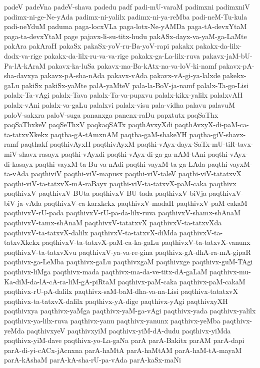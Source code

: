 {padeV
padeVna
padeV-shava
padedu
padf
padi-mU-varaM
padimxni
padimxniV
padimx-ni-ge-Ne-yAda
padimx-ni-yalilx
padimx-ni-ya-reMba
padi-neM-Tu-kula
padi-neYduM
paduma
paga-locxVLa
paga-lotx-Ne-yAMDa
paga-tA-devxYtaM
paga-ta-devxYtaM
page
pajavx-li-su-titx-hudu
pakASx-dayx-va-yaM-ga-LaMte
pakAra
pakAraH
pakaSx
pakaSx-yoV-ru-Ba-yoV-rapi
pakakx
pakakx-da-lilx-dadx-va-rige
pakakx-da-lilx-ru-va-va-rige
pakakx-ga-La-lilx-ruva
pakavx-jaM-bU-Pa-lA-kAraM
pakavx-ka-luSa
pakavx-ma-Ba-kAtx-na-va-loV-ki-namf
pakavx-pA-sha-davxya
pakavx-pA-sha-nAda
pakavx-vAda
pakavx-vA-gi-ya-lalxde
pakekx-gaLu
pakiSx
pakiSx-yaMte
palA-yaMteV
pala-la-BoV-ja-namf
palalx-Ta-go-Lisi
palalx-Ta-vAgi
palalx-Tava
palalx-Ta-va-pupxvu
palalx-kikx-yalilx
palalxvAH
palalx-vAni
palalx-va-gaLu
palalxvi
palalx-visu
pala-vidha
palavu
palavuM
paloV-sakxra
paloV-suga
pananxga
panenx-raDu
papxtutx
paqSaThx
paqSaThxkeV
paqSeThxV
paqkaqSATx
paqthAvxyXdi
paqthAvxyX-di-paM-ca-ta-tatxvXkekx
paqtha-gA-tAmxnAM
paqtha-gaM-shakeYH
paqtha-giV-shavx-ramf
paqthakf
paqthivAyxH
paqthivAyxM
paqthi-vAyx-dayx-SaTx-mU-tiR-tavx-miV-shavx-rasayx
paqthi-vAyxdi
paqthi-vAyx-di-ga-ga-nAM-tAni
paqthi-vAyx-di-kasayx
paqthi-vayxM-ta-Bu-va-nAdi
paqthi-vayxM-ta-ga-LAda
paqthi-vayxM-ta-vAda
paqthiviV
paqthi-viV-mapusx
paqthi-viV-taleV
paqthi-viV-tatatxvX
paqthi-viV-ta-tatxvX-mA-raBayx
paqthi-viV-ta-tatxvX-paM-caka
paqthivx
paqthivxV
paqthivxV-BUta
paqthivxV-BU-tada
paqthivxV-biVja
paqthivxV-biV-ja-vAda
paqthivxV-ca-karxkekx
paqthivxV-madaH
paqthivxV-paM-cakaM
paqthivxV-rU-pada
paqthivxV-rU-pa-da-lilx-ruva
paqthivxV-shamx-shAnaM
paqthivxV-tamx-shAnaM
paqthivxV-tatatxvX
paqthivxV-ta-tatxvXda
paqthivxV-ta-tatxvX-dalilx
paqthivxV-ta-tatxvX-diMda
paqthivxV-ta-tatxvXkekx
paqthivxV-ta-tatxvX-paM-ca-ka-gaLu
paqthivxV-ta-tatxvX-vanunx
paqthivxV-ta-tatxvXvu
paqthivxV-ya-va-re-gina
paqthivx-gA-dhA-ra-mA-gipaR
paqthivx-ga-LeMba
paqthivx-gaLu
paqthivxgaM
paqthivxge
paqthivx-guM-TAgi
paqthivx-liMga
paqthivx-mada
paqthivx-ma-da-ve-titx-dA-gaLaM
paqthivx-mu-Ka-diM-da-lA-cA-ra-liM-gA-piRtaM
paqthivx-paM-caka
paqthivx-paM-cakaM
paqthivx-rU-pA-dalilx
paqthivx-saM-baM-dha-va-na-Lisi
paqthivx-tatatxvX
paqthivx-ta-tatxvX-dalilx
paqthivx-yA-dige
paqthivx-yAgi
paqthivxyXH
paqthivxya
paqthivx-yaMga
paqthivx-yaM-ga-vAgi
paqthivx-yada
paqthivx-yalilx
paqthivx-ya-lilx-ruva
paqthivx-yanu
paqthivx-yanunx
paqthivx-yeMba
paqthivx-yeMda
paqthivxyeV
paqthivxyiM
paqthivx-yiM-dA-dudu
paqthivx-yiMda
paqthivx-yiM-dave
paqthivx-yo-La-gaNa
parA
parA-Bakitx
parAM
parA-dapi
parA-di-yi-cACx-jAcnxna
parA-haMtA
parA-haMtAM
parA-haM-tA-mayaM
parA-kAshaM
parA-kA-sha-rU-pa-vAda
parA-kaSx-maNi
}
